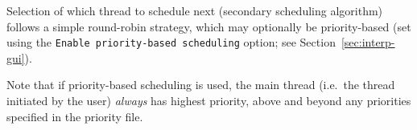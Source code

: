 \documentclass[\pformat,12pt]{article}
\newcommand{\vdmslpp}{VDM++}
\newcommand{\Toolbox}{Toolbox}
\newcommand{\guicmd}[1]{{\sf #1}}
\begin{document}
Selection of which thread to schedule next (secondary scheduling
algorithm) follows a simple round-robin strategy, which may optionally
be priority-based (set using the \texttt{Enable priority-based
  scheduling} option; see Section~\ref{sec:interp-gui}).

Note that if priority-based scheduling is used, the main thread
(i.e.\ the thread initiated by the user) \textit{always} has highest
priority, above and beyond any priorities specified in the priority
file.




% 
%




\end{document}
